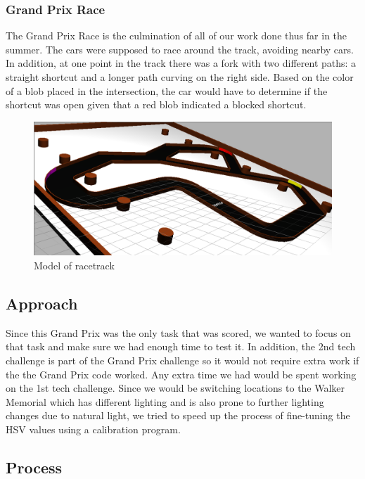 \documentclass[journal, a4paper]{IEEEtran}
\begin{document}
\subsubsection{Grand Prix Race}
The Grand Prix Race is the culmination of all of our work done thus far in the summer. The cars were supposed to race around the track, avoiding nearby cars. In addition, at one point in the track there was a fork with two different paths: a straight shortcut and a longer path curving on the right side. Based on the color of a blob placed in the intersection, the car would have to determine if the shortcut was open given that a red blob indicated a blocked shortcut. 
\begin{figure}[H]
\includegraphics[scale=.20]{gazebo_track.png}
\caption{Model of racetrack \cite{gazebo_pic}} 
\end{figure}
\subsection{Approach}
Since this Grand Prix was the only task that was scored, we wanted to focus on that task and make sure we had enough time to test it. In addition, the 2nd tech challenge is part of the Grand Prix challenge so it would not require extra work if the the Grand Prix code worked. Any extra time we had would be spent working on the 1st tech challenge. Since we would be switching locations to the Walker Memorial which has different lighting and is also prone to further lighting changes due to natural light, we tried to speed up the process of fine-tuning the HSV values using a calibration program.
\subsection{Process}
\end{document}
